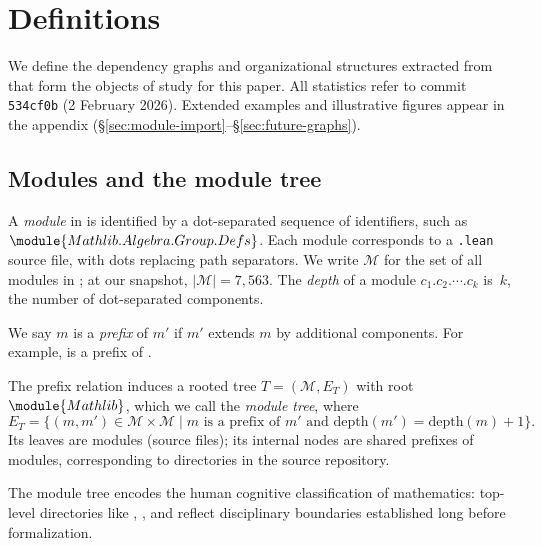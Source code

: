 \section{Definitions}
\label{sec:definitions}

We define the dependency graphs and organizational structures extracted from  that form the objects of study for this paper. All statistics refer to commit \texttt{534cf0b} (2 February 2026). Extended examples and illustrative figures appear in the appendix (\S\ref{sec:module-import}--\S\ref{sec:future-graphs}).

\subsection{Modules and the module tree}

\begin{definition}[Module]\label{def:module}
A \emph{module} in  is identified by a dot-separated sequence of identifiers, such as $\module{Mathlib.Algebra.Group.Defs}$. Each module corresponds to a \texttt{.lean} source file, with dots replacing path separators. We write $\mathcal{M}$ for the set of all modules in ; at our snapshot, $|\mathcal{M}| = 7{,}563$.
The \emph{depth} of a module $c_1.c_2.\cdots.c_k$ is~$k$, the number of dot-separated components.
\end{definition}

We say $m$ is a \emph{prefix} of $m'$ if $m'$ extends $m$ by additional components. For example,  is a prefix of .

\begin{definition}\label{def:module-tree}
The prefix relation induces a rooted tree $T = (\mathcal{M}, E_T)$ with root $\module{Mathlib}$, which we call the \emph{module tree}, where
\[
  E_T = \{(m, m') \in \mathcal{M} \times \mathcal{M} \mid m \text{ is a prefix of } m' \text{ and } \mathrm{depth}(m') = \mathrm{depth}(m) + 1\}.
\]
Its leaves are modules (source files); its internal nodes are shared prefixes of modules, corresponding to directories in the source repository.
\end{definition}

The module tree encodes the human cognitive classification of mathematics: top-level directories like , , and  reflect disciplinary boundaries established long before formalization.

